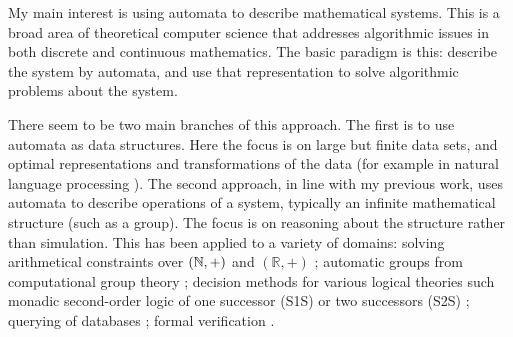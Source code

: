 \documentclass[11pt]{article}
\theoremstyle{plain} \numberwithin{equation}{section}
\theoremstyle{definition}
\begin{document}
\thispagestyle{fancy}

\noindent
My main interest is using automata to describe mathematical systems. This is a broad area of theoretical computer science that addresses algorithmic issues in both discrete and continuous mathematics. The basic paradigm is this: describe the system by automata, and use that representation to solve algorithmic problems about the system.

There seem to be two main branches of this approach. The first is to use automata as data structures. Here the focus is on large but finite data sets, and optimal representations and transformations of the data (for example in natural language processing \cite{mpr07}). The second approach, in line with my previous work, uses automata to describe operations of a system, typically an infinite mathematical structure (such as a group). The focus is on reasoning about the structure rather than simulation.
This has been applied to a variety of domains: solving arithmetical constraints over $({\mathbb N},+)$ and $(\mathbb{R},+)$ \cite{BoWo95, Klae03}; automatic groups from computational group theory \cite{CEHLPT92}; decision methods for various logical theories such monadic second-order logic of one successor (S1S) or two successors (S2S) \cite{Thoma90}; querying of databases \cite{BeLi02}; formal verification \cite{VaWo94}.





\end{document}
